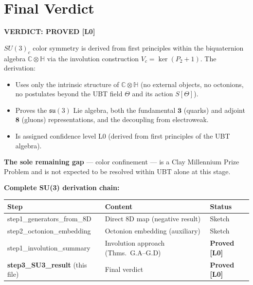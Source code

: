 \documentclass[12pt,a4paper]{article}
\theoremstyle{definition}
\theoremstyle{remark}
\begin{document}
\section{Final Verdict}
\label{sec:verdict}

\begin{resultbox}
\textbf{VERDICT: PROVED [L0]}

$SU(3)_c$ color symmetry is derived from first principles within the
biquaternion algebra $\mathbb{C}\otimes\mathbb{H}$ via the involution
construction $V_c = \ker(P_2+1)$.  The derivation:
\begin{itemize}
  \item Uses only the intrinsic structure of $\mathbb{C}\otimes\mathbb{H}$
        (no external objects, no octonions, no postulates beyond the UBT field
        $\Theta$ and its action $S[\Theta]$).
  \item Proves the $\mathfrak{su}(3)$ Lie algebra, both the fundamental
        $\mathbf{3}$ (quarks) and adjoint $\mathbf{8}$ (gluons) representations,
        and the decoupling from electroweak.
  \item Is assigned confidence level L0 (derived from first principles of
        the UBT algebra).
\end{itemize}

\textbf{The sole remaining gap} --- color confinement --- is a Clay Millennium
Prize Problem and is not expected to be resolved within UBT alone at this stage.

\textbf{Complete SU(3) derivation chain:}
\begin{center}
\begin{tabular}{lll}
  \toprule
  \textbf{Step} & \textbf{Content} & \textbf{Status} \\
  \midrule
  step1\_generators\_from\_8D & Direct 8D map (negative result) & Sketch \\
  step2\_octonion\_embedding & Octonion embedding (auxiliary) & Sketch \\
  step1\_involution\_summary & Involution approach (Thms.~G.A--G.D) & \textbf{Proved [L0]} \\
  \textbf{step3\_SU3\_result} (this file) & Final verdict & \textbf{Proved [L0]} \\
  \bottomrule
\end{tabular}
\end{center}
\end{resultbox}

\ifdefined\INCLUDEMODE
\else
  
\end{document}
